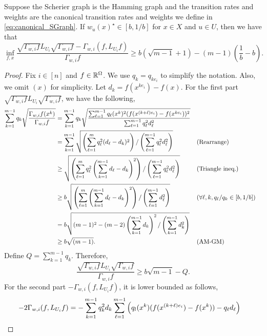 \begin{lemma}\label{lem:local_curvature}
    Suppose the Scherier graph is the Hamming graph and the transition rates and weights are the canonical transition rates and weights we define in \eqref{eq:canonical_SGraph}.
    If $w_u(x)^\star \in [b,1/b]$ for $x\in X$ and $u\in U$, then we have that
    $$
        \inf_{f,x} \frac{\sqrt{\Gamma_{w,i}f}L_{U_i}\sqrt{\Gamma_{w,i}f} - \Gamma_{w,i}(f,L_{U_i}f)}{\Gamma_{w,i} f} \geq b(\sqrt{m-1}+1)-(m-1)(\frac 1b-b).
    $$
\end{lemma}
\begin{proof}
    Fix $i\in[n]$ and $f\in \mathbb{R}^\Omega$.
    We use $q_{k} = q_{k e_i}$ to simplify the notation.
    Also, we omit $(x)$ for simplicity.
    Let $d_k = f(x^{k e_i}) - f(x)$.
    For the first part $\sqrt{\Gamma_{w,i} f}L_{U_i}\sqrt{\Gamma_{w,i} f}$, we have the following,
    \begin{align}
        \sum_{k=1}^{m-1} q_k\sqrt{\frac{\Gamma_{w,i} f(x^k)}{\Gamma_{w,i}f}} 
        &= \sum_{k=1}^{m-1}q_k\sqrt{\frac{\sum_{\ell = 1}^{m-1}q_\ell(x^k)^2(f(x^{(k+\ell)e_i}) - f(x^{k e_i}))^2}{\sum_{\ell=1}^{m-1}q_\ell^2d_\ell^2}} \nonumber
        \\& = \sum_{k=1}^{m-1}\sqrt{\left(\sum_{\ell = 1}^{m}q_\ell^2(d_\ell - d_k)^2\right) / \left(\sum_{\ell=1}^{m-1}q_\ell^2d_\ell^2\right)} &&(\text{Rearrange}) \nonumber
        \\&\geq \sqrt{\left(\sum_{\ell = 1}^m q_\ell^2\left(\sum_{k=1}^{m-1} d_\ell - d_k\right)^2 \right)/ \left(\sum_{\ell=1}^{m-1}q_\ell^2d_\ell^2\right)} &&(\text{Triangle ineq.}) \nonumber
        \\&\geq b\sqrt{\left(\sum_{\ell = 1}^m \left(\sum_{k=1}^{m-1} d_\ell - d_k\right)^2 \right)/ \left(\sum_{\ell=1}^{m-1}d_\ell^2\right)} &&(\forall \ell,k,q_\ell/q_k \in [b,1/b]) \nonumber
        \\&= b\sqrt{(m-1)^2 - (m-2)\left(\sum_{k=1}^{m-1}d_k\right)^2/\left(\sum_{k=1}^{m-1}d_k^2\right)} \nonumber
        \\&\geq b\sqrt{(m-1)}. &&(\text{AM-GM}) \label{eq:Local_curvature_part1}
    \end{align}
    Define $Q = \sum_{k=1}^{m-1} q_k$.
    Therefore, 
    $$
        \frac{\sqrt{\Gamma_{w,i} f}L_{U_i}\sqrt{\Gamma_{w,i} f}}{\Gamma_{w,i} f} \geq b\sqrt{m-1} - Q.
    $$
    For the second part $-\Gamma_{w,i}(f,L_{U_i} f)$, it is lower bounded as follows,
    \begin{align}
        -2\Gamma_{w,i}(f,L_{U_i} f)
        &= -\sum_{k=1}^{m-1} q_k^2 d_k \sum_{\ell=1}^{m-1} \tp{q_l(x^k)(f(x^{(k+\ell)e_i}) - f(x^k)) - q_\ell d_\ell} \nonumber

\end{align}
\end{proof}
